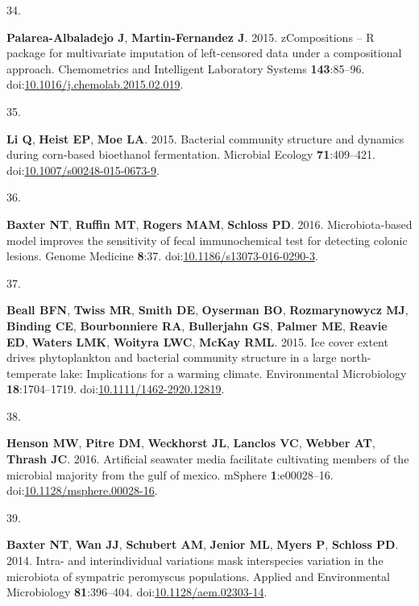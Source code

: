 \documentclass[
]{article}
\newlength{\cslhangindent}
\newlength{\csllabelwidth}
\newlength{\cslentryspacingunit} %
\newenvironment{CSLReferences}[2] %
 {%
  \setlength{\parindent}{0pt}
  \ifodd #1
  \let\oldpar\par
  \def\par{\hangindent=\cslhangindent\oldpar}
  \fi
  \setlength{\parskip}{#2\cslentryspacingunit}
 }%
 {}
\newcommand{\CSLLeftMargin}[1]{\parbox[t]{\csllabelwidth}{#1}}
\newcommand{\CSLRightInline}[1]{\parbox[t]{\linewidth - \csllabelwidth}{#1}\break}
\begin{document}
\begin{CSLReferences}{0}{1}
\leavevmode{}%
\CSLLeftMargin{34. }%
\CSLRightInline{\textbf{Palarea-Albaladejo J}, \textbf{Martin-Fernandez
J}. 2015. zCompositions -- {R} package for multivariate imputation of
left-censored data under a compositional approach. Chemometrics and
Intelligent Laboratory Systems \textbf{143}:85--96.
doi:\href{https://doi.org/10.1016/j.chemolab.2015.02.019}{10.1016/j.chemolab.2015.02.019}.}

\leavevmode{}%
\CSLLeftMargin{35. }%
\CSLRightInline{\textbf{Li Q}, \textbf{Heist EP}, \textbf{Moe LA}. 2015.
Bacterial community structure and dynamics during corn-based bioethanol
fermentation. Microbial Ecology \textbf{71}:409--421.
doi:\href{https://doi.org/10.1007/s00248-015-0673-9}{10.1007/s00248-015-0673-9}.}

\leavevmode{}%
\CSLLeftMargin{36. }%
\CSLRightInline{\textbf{Baxter NT}, \textbf{Ruffin MT}, \textbf{Rogers
MAM}, \textbf{Schloss PD}. 2016. Microbiota-based model improves the
sensitivity of fecal immunochemical test for detecting colonic lesions.
Genome Medicine \textbf{8}:37.
doi:\href{https://doi.org/10.1186/s13073-016-0290-3}{10.1186/s13073-016-0290-3}.}

\leavevmode{}%
\CSLLeftMargin{37. }%
\CSLRightInline{\textbf{Beall BFN}, \textbf{Twiss MR}, \textbf{Smith
DE}, \textbf{Oyserman BO}, \textbf{Rozmarynowycz MJ}, \textbf{Binding
CE}, \textbf{Bourbonniere RA}, \textbf{Bullerjahn GS}, \textbf{Palmer
ME}, \textbf{Reavie ED}, \textbf{Waters LMK}, \textbf{Woityra LWC},
\textbf{McKay RML}. 2015. Ice cover extent drives phytoplankton and
bacterial community structure in a large north-temperate lake:
Implications for a warming climate. Environmental Microbiology
\textbf{18}:1704--1719.
doi:\href{https://doi.org/10.1111/1462-2920.12819}{10.1111/1462-2920.12819}.}

\leavevmode{}%
\CSLLeftMargin{38. }%
\CSLRightInline{\textbf{Henson MW}, \textbf{Pitre DM}, \textbf{Weckhorst
JL}, \textbf{Lanclos VC}, \textbf{Webber AT}, \textbf{Thrash JC}. 2016.
Artificial seawater media facilitate cultivating members of the
microbial majority from the gulf of mexico. {mSphere}
\textbf{1}:e00028--16.
doi:\href{https://doi.org/10.1128/msphere.00028-16}{10.1128/msphere.00028-16}.}

\leavevmode{}%
\CSLLeftMargin{39. }%
\CSLRightInline{\textbf{Baxter NT}, \textbf{Wan JJ}, \textbf{Schubert
AM}, \textbf{Jenior ML}, \textbf{Myers P}, \textbf{Schloss PD}. 2014.
Intra- and interindividual variations mask interspecies variation in the
microbiota of sympatric peromyscus populations. Applied and
Environmental Microbiology \textbf{81}:396--404.
doi:\href{https://doi.org/10.1128/aem.02303-14}{10.1128/aem.02303-14}.}


\end{CSLReferences}
\end{document}

